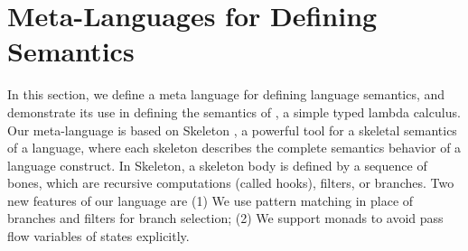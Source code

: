 \section{Meta-Languages for Defining Semantics}\label{sec:host}

In this section, we define a meta language for defining language semantics, and demonstrate its use in defining the semantics of \STLC{}, a simple typed lambda calculus.
Our meta-language is based on Skeleton \cite{skeleton}, a powerful tool 
for a skeletal semantics of a language, where each skeleton describes the complete semantics behavior of a language construct. 
In Skeleton, 
a skeleton body is defined by a sequence of bones,
which are recursive computations (called hooks), filters, or branches.
Two new features of our language are
(1) We use pattern matching in place of branches and filters for branch selection;
(2) We support monads to avoid pass flow variables of states explicitly.



